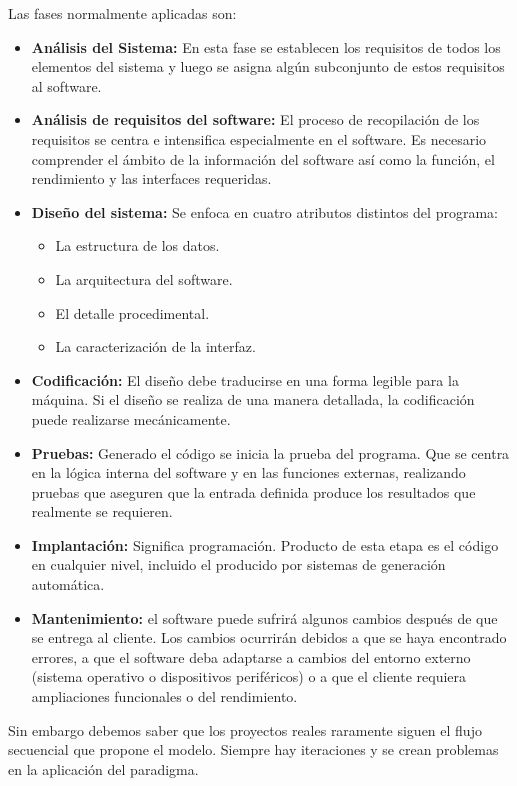 	Las fases normalmente aplicadas son:
	\begin{itemize}
		\item \textbf{An\'alisis del Sistema:} En esta fase se establecen los requisitos de todos los elementos del sistema y luego se asigna alg\'un subconjunto de estos requisitos al software.
		\item \textbf{An\'alisis de requisitos del software:} El proceso de recopilaci\'on de los requisitos se centra e intensifica especialmente en el software. Es necesario comprender el \'ambito de la informaci\'on del software as\'i como la funci\'on, el rendimiento y las interfaces requeridas.
		\item \textbf{Dise\~no del sistema:} Se enfoca en cuatro atributos distintos del programa: 
			\begin{itemize}
				\item La estructura de los datos.
				\item La arquitectura del software.
				\item El detalle procedimental.
				\item La caracterizaci\'on de la interfaz. 
			\end{itemize}
		\item \textbf{Codificaci\'on:} El dise\~no debe traducirse en una forma legible para la m\'aquina. Si el dise\~no se realiza de una manera detallada, la codificaci\'on puede realizarse mec\'anicamente.
		\item \textbf{Pruebas:} Generado el c\'odigo se inicia la prueba del programa. Que se centra en la l\'ogica interna del software y en las funciones externas, realizando pruebas que aseguren que la entrada definida produce los resultados que realmente se requieren.
		\item \textbf{Implantaci\'on:} Significa programaci\'on. Producto de esta etapa es el c\'odigo en cualquier nivel, incluido el producido por sistemas de generaci\'on autom\'atica.
		\item \textbf{Mantenimiento:} el software  puede sufrir\'a algunos cambios despu\'es de que se entrega al cliente. Los cambios ocurrir\'an debidos a que se haya encontrado errores, a que el software deba adaptarse a cambios del entorno externo (sistema operativo o dispositivos perif\'ericos) o a que el cliente requiera ampliaciones funcionales o del rendimiento.
	\end{itemize}


	Sin embargo debemos saber que los proyectos reales raramente siguen el flujo secuencial que propone el modelo. Siempre hay iteraciones y se crean problemas en la aplicaci\'on del paradigma.\\

